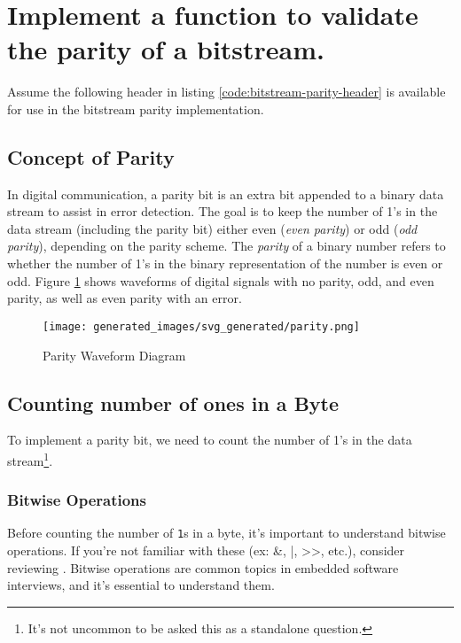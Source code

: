 \documentclass[main.tex]{subfiles}
\begin{document}
\section{Implement a function to validate the parity of a bitstream.}
Assume the following header in listing \ref{code:bitstream-parity-header} is available for use in the bitstream parity implementation. 



\spoilerline

\subsection{Concept of Parity}
In digital communication, a parity bit is an extra bit appended to a binary data stream to assist in error detection. The goal is to keep the number of 1's in the data stream (including the parity bit) either even (\textit{even parity}) or odd (\textit{odd parity}), depending on the parity scheme. The \textit{parity} of a binary number refers to whether the number of 1's in the binary representation of the number is even or odd. Figure \ref{fig:parity-waveform-diagram} shows waveforms of digital signals with no parity, odd, and even parity, as well as even parity with an error. 

\begin{figure}[H]
    \centering
    \texttt{[image: generated\_images/svg\_generated/parity.png]}
    \caption{Parity Waveform Diagram}
    \label{fig:parity-waveform-diagram}
\end{figure}

\subsection {Counting number of ones in a Byte}
To implement a parity bit, we need to count the number of 1's in the data stream\footnote{It's not uncommon to be asked this as a standalone question.}. 
\subsubsection{Bitwise Operations}
Before counting the number of \texttt{1}s in a byte, it’s important to understand bitwise operations. If you’re not familiar with these (ex: \&, |, >>, etc.), consider reviewing . Bitwise operations are common topics in embedded software interviews, and it's essential to understand them.
\end{document}
